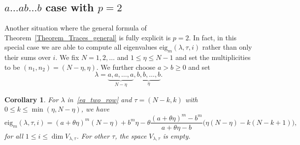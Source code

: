 \documentclass[11pt]{article}
\newtheorem{coro}[theo]{Corollary}
\theoremstyle{definition}
\numberwithin{equation}{section}
\begin{document}
\subsection{\texorpdfstring{$a\dots ab\dots b$}{a...ab...b} case with \texorpdfstring{$p=2$}{p=2}} Another situation where the general formula of Theorem~\ref{Theorem_Traces_general} is fully explicit is $p=2$. In fact, in this special case we are able to compute all eigenvalues $\mathrm{eig}_m(\lambda,\tau,i)$ rather than only their sums over $i$. We fix $N=1,2,\dots$ and $1\le \eta \le N-1$ and set the multiplicities to be $(n_1,n_2)= (N-\eta,\eta)$. We further choose $a>b\ge 0$ and set
\begin{equation}
\label{eq_two_row}
 \lambda= \underbrace{a,a,\dots,a}_{N-\eta}, \underbrace{b,b,\dots,b}_{\eta}.
\end{equation}
\begin{coro} \label{Corollary_ab}
 For $\lambda$ in~\eqref{eq_two_row} and $\tau=(N-k,k)$ with $0\le k\le \min(\eta,N-\eta)$, we have
 $$
   \mathrm{eig}_m(\lambda,\tau,i) = (a+\theta \eta)^m (N-\eta) + b^m \eta-\theta \frac{(a+\theta \eta)^m- b^m}{a+\theta \eta -b}  \bigl(\eta (N-\eta) -k(N-k+1)\bigr) ,
 $$
 for all $1\le i\le \dim V_{\lambda,\tau}$. For other $\tau$, the space $V_{\lambda,\tau}$ is empty.
\end{coro}
\end{document}
